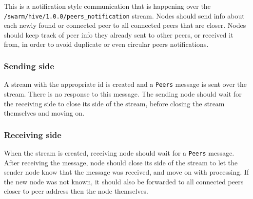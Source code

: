 This is a notification style communication that is happening over the \texttt{/swarm/hive/1.0.0/peers\_notification} stream. Nodes should send info about each newly found or connected peer to all connected peers that are closer. Nodes should keep track of peer info they already sent to other peers, or received it from, in order to avoid  duplicate or even circular peers notifications.

\subsubsection{Sending side}

A stream with the appropriate id is created and a \texttt{Peers} message is sent over the stream. There is no response to this message. The sending node should wait for the receiving side to close its side of the stream, before closing the stream themselves and moving on.

\subsubsection{Receiving side}

When the stream is created, receiving node should wait for a \texttt{Peers} message. After receiving the message, node should close its side of the stream to let the sender node know that the message was received, and move on with processing. If the new node was not known, it should also be forwarded to all connected peers closer to peer address then the node themselves.



